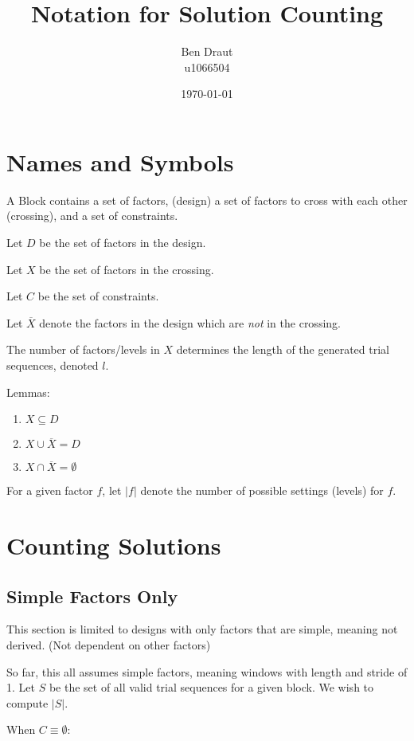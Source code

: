 \documentclass[a4paper]{article}
\title{Notation for Solution Counting}
\author{Ben Draut \\ u1066504}
\date{\today}
\begin{document}
\section{Names and Symbols}

A Block contains a set of factors, (design) a set of factors to cross with each other (crossing), and a set of constraints.

Let $D$ be the set of factors in the design. \newline

Let $X$ be the set of factors in the crossing. \newline

Let $C$ be the set of constraints. \newline

Let $\overline{X}$ denote the factors in the design which are \textit{not} in the crossing. \newline

The number of factors/levels in $X$ determines the length of the generated trial sequences, denoted $l$. \newline

Lemmas:

\begin{enumerate}
\item $X \subseteq D$
\item $X \cup \overline{X} = D$
\item $X \cap \overline{X} = \emptyset$
\end{enumerate}

For a given factor $f$, let $|f|$ denote the number of possible settings (levels) for $f$.

\section{Counting Solutions}

\subsection{Simple Factors Only}

This section is limited to designs with only factors that are simple, meaning not derived. (Not dependent on other factors)

So far, this all assumes simple factors, meaning windows with length and stride of 1.
Let $S$ be the set of all valid trial sequences for a given block. We wish to compute $|S|$.

When $C \equiv \emptyset$:
\end{document}
